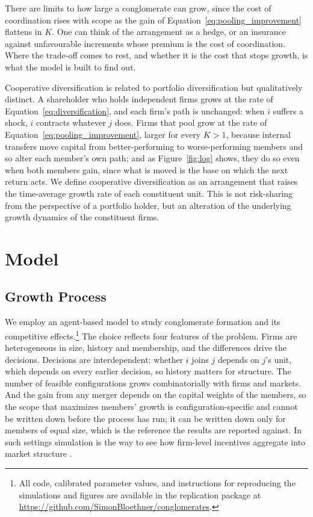 \documentclass[12pt,a4paper]{article}
\begin{document}
There are limits to how large a conglomerate can grow, since the cost of coordination rises with scope \parencite{coase19883} as the gain of Equation~\ref{eq:pooling_improvement} flattens in $K$. One can think of the arrangement as a hedge, or an insurance against unfavourable increments whose premium is the cost of coordination. Where the trade-off comes to rest, and whether it is the cost that stops growth, is what the model is built to find out. 

Cooperative diversification is related to portfolio diversification but qualitatively distinct. A shareholder who holds independent firms grows at the rate of Equation~\ref{eq:diversification}, and each firm's path is unchanged: when $i$ suffers a shock, $i$ contracts whatever $j$ does. Firms that pool grow at the rate of Equation~\ref{eq:pooling_improvement}, larger for every $K > 1$, because internal transfers move capital from better-performing to worse-performing members and so alter each member's own path; and as Figure~\ref{fig:log} shows, they do so even when both members gain, since what is moved is the base on which the next return acts. We define cooperative diversification as an arrangement that raises the time-average growth rate of each constituent unit. This is not risk-sharing from the perspective of a portfolio holder, but an alteration of the underlying growth dynamics of the constituent firms. 

\section{Model}
\label{sec:Model}
\subsection{Growth Process}\label{sec:growth}
We employ an agent-based model to study conglomerate formation and its competitive effects.\footnote{All code, calibrated parameter values, and instructions for reproducing the simulations and figures are available in the replication package at \href{https://github.com/SimonBloethner/conglomerates}{https://github.com/SimonBloethner/conglomerates}.} The choice reflects four features of the problem. Firms are heterogeneous in size, history and membership, and the differences drive the decisions. Decisions are interdependent: whether $i$ joins $j$ depends on $j$'s unit, which depends on every earlier decision, so history matters for structure. The number of feasible configurations grows combinatorially with firms and markets. And the gain from any merger depends on the capital weights of the members, so the scope that maximizes members' growth is configuration-specific and cannot be written down before the process has run; it can be written down only for members of equal size, which is the reference the results are reported against. In such settings simulation is the way to see how firm-level incentives aggregate into market structure \parencite{axtell2025agent}. 
\end{document}
